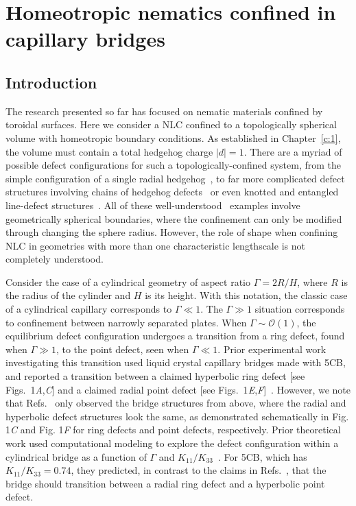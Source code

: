\chapter{Homeotropic nematics confined in capillary bridges}

\section{Introduction}
The research presented so far has focused on nematic materials confined by toroidal surfaces.
Here we consider a NLC confined to a topologically spherical volume with homeotropic boundary conditions.
As established in Chapter~\ref{c:1}, the volume must contain a total hedgehog charge $|d| = 1$.
There are a myriad of possible defect configurations for such a topologically-confined system, from the simple configuration of a single radial hedgehog~\cite{RN177}, to far more complicated defect structures involving chains of hedgehog defects~\cite{RN150} or even knotted and entangled line-defect structures~\cite{RN277,RN278}.
All of these well-understood~\cite{RN93,RN275,RN276} examples involve geometrically spherical boundaries, where the confinement can only be modified through changing the sphere radius.
However, the role of shape when confining NLC in geometries with more than one characteristic lengthscale is not completely understood.

Consider the case of a cylindrical geometry of aspect ratio $\Gamma = 2 R/H$, where $R$ is the radius of the cylinder and $H$ is its height.
With this notation, the classic case of a cylindrical capillary corresponds to $\Gamma \ll 1$. The $\Gamma \gg 1$ situation corresponds to confinement between narrowly separated plates.
When $\Gamma \sim \mathcal{O}\left( 1 \right)$, the equilibrium defect configuration undergoes a transition from a ring defect, found when $\Gamma \gg 1$, to the point defect, seen when $\Gamma \ll 1$.
Prior experimental work investigating this transition used liquid crystal capillary bridges made with 5CB, and reported a transition between a claimed hyperbolic ring defect [see Figs.~1\emph{A},\emph{C}] and a claimed radial point defect [see Figs.~1\emph{E},\emph{F}]~\cite{RN139,RN147}.
However, we note that Refs.~\cite{RN139,RN147} only observed the bridge structures from above, where the radial and hyperbolic defect structures look the same, as demonstrated schematically in Fig. 1\emph{C} and Fig. 1\emph{F} for ring defects and point defects, respectively.
Prior theoretical work used computational modeling to explore the defect configuration within a cylindrical bridge as a function of $\Gamma$ and $K_{11}/K_{33}$~\cite{RN138,RN144}.
For 5CB, which has $K_{11}/K_{33} = 0.74$, they predicted, in contrast to the claims in Refs.~\cite{RN139,RN147}, that the bridge should transition between a radial ring defect and a hyperbolic point defect.

